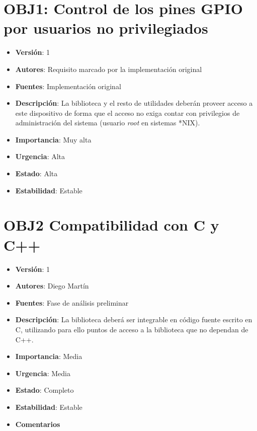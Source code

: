 \documentclass[letterpaper,10pt,spanish]{sphinxmanual}
\begin{document}
\section{\textbf{OBJ1}: Control de los pines GPIO por usuarios no privilegiados}
\label{analysis/goals:obj1-control-de-los-pines-gpio-por-usuarios-no-privilegiados}\begin{itemize}
\item {} 
\textbf{Versión}: 1

\item {} 
\textbf{Autores}: Requisito marcado por la implementación original

\item {} 
\textbf{Fuentes}: Implementación original

\item {} 
\textbf{Descripción}: La biblioteca y el resto de utilidades deberán proveer acceso a este dispositivo de forma que el acceso no exiga contar con privilegios de administración del sistema (usuario \emph{root} en sistemas *NIX).

\item {} 
\textbf{Importancia}: Muy alta

\item {} 
\textbf{Urgencia}: Alta

\item {} 
\textbf{Estado}: Alta

\item {} 
\textbf{Estabilidad}: Estable

\end{itemize}


\section{\textbf{OBJ2} Compatibilidad con C y C++}
\label{analysis/goals:obj2-compatibilidad-con-c-y-c}\begin{itemize}
\item {} 
\textbf{Versión}: 1

\item {} 
\textbf{Autores}: Diego Martín

\item {} 
\textbf{Fuentes}: Fase de análisis preliminar

\item {} 
\textbf{Descripción}: La biblioteca deberá ser integrable en código fuente escrito en C, utilizando para ello puntos de acceso a la biblioteca que no dependan de C++.

\item {} 
\textbf{Importancia}: Media

\item {} 
\textbf{Urgencia}: Media

\item {} 
\textbf{Estado}: Completo

\item {} 
\textbf{Estabilidad}: Estable

\item {} 
\textbf{Comentarios}

\end{itemize}
\end{document}
